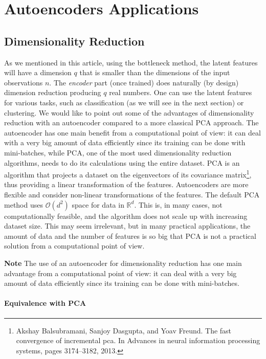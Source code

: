 \documentclass[12pt,a4]{article}
\newenvironment{note}
{\begin{mdframed}[backgroundcolor=light-gray, roundcorner=10pt,leftmargin=1, rightmargin=1, innerleftmargin=15, innertopmargin=15,innerbottommargin=15, outerlinewidth=1, linecolor=light-gray]}
{\end{mdframed}}
\begin{document}
\section{Autoencoders Applications}

\subsection{Dimensionality Reduction}

As we mentioned in this article, using the bottleneck method, the latent features will have a dimension \( q\) that is smaller than the dimensions of the input observations \( n\). The \textit{encoder} part (once trained) does naturally (by design) dimension reduction producing \( q\) real numbers. One can use the latent features for various tasks, such as classification (as we will see in the next section) or clustering. We would like to point out some of the advantages of dimensionality reduction with an autoencoder compared to a more classical PCA approach. The autoencoder has one main benefit from a computational point of view: it can deal with a very big amount of data efficiently since its training can be done with mini-batches, while PCA, one of the most used dimensionality reduction algorithms, needs to do its calculations using the entire dataset. PCA is an algorithm that projects a dataset on the eigenvectors of its covariance matrix\footnote{ Akshay Balsubramani, Sanjoy Dasgupta, and Yoav Freund. The fast convergence of incremental pca. In Advances in neural information processing systems, pages 3174–3182, 2013.}, thus providing a linear transformation of the features. Autoencoders are more flexible and consider non-linear transformations of the features. The default PCA method uses \(\mathcal{O}\left(d^{2}\right)\) space for data in \(\mathbb{R}^{d}\). This is, in many cases, not computationally feasible, and the algorithm does not scale up with increasing dataset size. This may seem irrelevant, but in many practical applications, the amount of data and the number of features is so big that PCA is not a practical solution from a computational point of view. 
\begin{note}
\textbf{Note }The use of an autoencoder for dimensionality reduction has one main advantage from a computational point of view: it can deal with a very big amount of data efficiently since its training can be done with mini-batches.
\end{note}
\paragraph{Equivalence with PCA}
\end{document}
